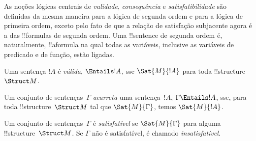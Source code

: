 \documentclass[../../../include/open-logic-section]{subfiles}
\begin{document}

\begin{explain}
As noções lógicas centrais de \emph{validade}, \emph{consequência} e
\emph{satisfatibilidade} são definidas da mesma maneira para a lógica de
segunda ordem e para a lógica de primeira ordem, exceto pelo fato de que a
relação de satisfação subjacente agora é a das !!{formula}s de segunda
ordem. Uma !!{sentence} de segunda ordem é, naturalmente, !!a{formula} na
qual todas as variáveis, inclusive as variáveis de predicado e de função,
estão ligadas.
\end{explain}

\begin{defn}[Validade]
Uma sentença $!A$ é \emph{válida}, $\Entails !A$, sse $\Sat{M}{!A}$ para
toda !!{structure}~$\Struct M$.
\end{defn}

\begin{defn}[Consequência]
Um conjunto de sentenças~$\Gamma$ \emph{acarreta} uma sentença~$!A$,
$\Gamma \Entails !A$, sse, para toda !!{structure}~$\Struct M$ tal que
$\Sat{M}{\Gamma}$, temos $\Sat{M}{!A}$.
\end{defn}

\begin{defn}[Satisfatibilidade]
Um conjunto de sentenças~$\Gamma$ é \emph{satisfatível} se
$\Sat{M}{\Gamma}$ para alguma !!{structure}~$\Struct M$. Se $\Gamma$ não é
satisfatível, é chamado \emph{insatisfatível}.
\end{defn}
\end{document}
